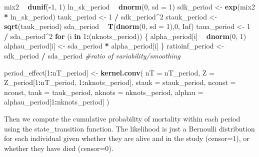 \documentclass[11pt,]{article}
\newenvironment{Shaded}{\begin{snugshade}}{\end{snugshade}}
\newcommand{\KeywordTok}[1]{\textcolor[rgb]{0.13,0.29,0.53}{\textbf{#1}}}
\newcommand{\DataTypeTok}[1]{\textcolor[rgb]{0.13,0.29,0.53}{#1}}
\newcommand{\DecValTok}[1]{\textcolor[rgb]{0.00,0.00,0.81}{#1}}
\newcommand{\StringTok}[1]{\textcolor[rgb]{0.31,0.60,0.02}{#1}}
\newcommand{\CommentTok}[1]{\textcolor[rgb]{0.56,0.35,0.01}{\textit{#1}}}
\newcommand{\OtherTok}[1]{\textcolor[rgb]{0.56,0.35,0.01}{#1}}
\newcommand{\ControlFlowTok}[1]{\textcolor[rgb]{0.13,0.29,0.53}{\textbf{#1}}}
\newcommand{\OperatorTok}[1]{\textcolor[rgb]{0.81,0.36,0.00}{\textbf{#1}}}
\newcommand{\NormalTok}[1]{#1}
\begin{document}
\begin{Shaded}
\begin{Highlighting}[]
\NormalTok{  mix2 }\OperatorTok{~}\StringTok{ }\KeywordTok{dunif}\NormalTok{(}\OperatorTok{-}\DecValTok{1}\NormalTok{, }\DecValTok{1}\NormalTok{)}
\NormalTok{  ln_sk_period }\OperatorTok{~}\StringTok{ }\KeywordTok{dnorm}\NormalTok{(}\DecValTok{0}\NormalTok{, }\DataTypeTok{sd =} \DecValTok{1}\NormalTok{)}
\NormalTok{  sdk_period <-}\StringTok{ }\KeywordTok{exp}\NormalTok{(mix2 }\OperatorTok{*}\StringTok{ }\NormalTok{ln_sk_period)}
\NormalTok{  tauk_period <-}\StringTok{ }\DecValTok{1} \OperatorTok{/}\StringTok{ }\NormalTok{sdk_period}\OperatorTok{^}\DecValTok{2}
\NormalTok{  stauk_period <-}\StringTok{ }\KeywordTok{sqrt}\NormalTok{(tauk_period)}
\NormalTok{  sda_period }\OperatorTok{~}\StringTok{ }\KeywordTok{T}\NormalTok{(}\KeywordTok{dnorm}\NormalTok{(}\DecValTok{0}\NormalTok{, }\DataTypeTok{sd =} \DecValTok{1}\NormalTok{),}\DecValTok{0}\NormalTok{, }\OtherTok{Inf}\NormalTok{)}
\NormalTok{  taua_period <-}\StringTok{ }\DecValTok{1} \OperatorTok{/}\StringTok{ }\NormalTok{sda_period}\OperatorTok{^}\DecValTok{2}
  \ControlFlowTok{for}\NormalTok{ (i }\ControlFlowTok{in} \DecValTok{1}\OperatorTok{:}\NormalTok{(nknots_period)) \{}
\NormalTok{    alpha_period[i] }\OperatorTok{~}\StringTok{ }\KeywordTok{dnorm}\NormalTok{(}\DecValTok{0}\NormalTok{, }\DecValTok{1}\NormalTok{)}
\NormalTok{    alphau_period[i] <-}\StringTok{ }\NormalTok{sda_period }\OperatorTok{*}\StringTok{ }\NormalTok{alpha_period[i]}
\NormalTok{  \}}
\NormalTok{  ratioinf_period <-}\StringTok{ }\NormalTok{sdk_period }\OperatorTok{/}\StringTok{ }\NormalTok{sda_period }\CommentTok{#ratio of variability/smoothing}

\NormalTok{  period_effect[}\DecValTok{1}\OperatorTok{:}\NormalTok{nT_period] <-}\StringTok{ }\KeywordTok{kernel.conv}\NormalTok{(}
    \DataTypeTok{nT =}\NormalTok{ nT_period,}
    \DataTypeTok{Z =}\NormalTok{ Z_period[}\DecValTok{1}\OperatorTok{:}\NormalTok{nT_period, }\DecValTok{1}\OperatorTok{:}\NormalTok{nknots_period],}
    \DataTypeTok{stauk =}\NormalTok{ stauk_period,}
    \DataTypeTok{nconst =}\NormalTok{ nconst,}
    \DataTypeTok{tauk =}\NormalTok{ tauk_period,}
    \DataTypeTok{nknots =}\NormalTok{ nknots_period,}
    \DataTypeTok{alphau =}\NormalTok{ alphau_period[}\DecValTok{1}\OperatorTok{:}\NormalTok{nknots_period]}
\NormalTok{  )}
\end{Highlighting}
\end{Shaded}

Then we compute the cumulative probability of mortality within each
period using the state\_transition function. The likelihood is just a
Bernoulli distribution for each individual given whether they are alive
and in the study (censor=1), or whether they have died (censor=0).
\end{document}
